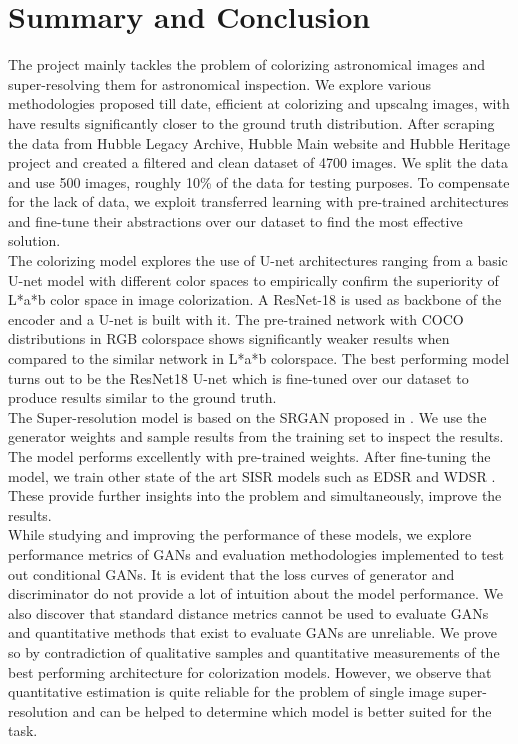 \documentclass[10pt,twocolumn,letterpaper]{article}
\begin{document}
\section{Summary and Conclusion}
    The project mainly tackles the problem of colorizing astronomical images and super-resolving them for astronomical inspection. We explore various methodologies proposed till date, efficient at colorizing and upscalng images, with have results significantly closer to the ground truth distribution. After scraping the data from Hubble Legacy Archive, Hubble Main website and Hubble Heritage project and created a filtered and clean dataset of 4700 images. We split the data and use 500 images, roughly 10\% of the data for testing purposes. To compensate for the lack of data, we exploit transferred learning with pre-trained architectures and fine-tune their abstractions over our dataset to find the most effective solution.\\
    \hspace*{0.167 in}The colorizing model explores the use of U-net architectures ranging from a basic U-net model with different color spaces to empirically confirm the superiority of L*a*b color space in image colorization. A ResNet-18  is used as backbone of the encoder and a U-net is built with it. The pre-trained network with COCO distributions in RGB colorspace shows significantly weaker results when compared to the similar network in L*a*b colorspace. The best performing model turns out to be the ResNet18 U-net which is fine-tuned over our dataset to produce results similar to the ground truth.\\
    \hspace*{0.167 in}The Super-resolution model is based on the SRGAN proposed in \cite{ledig2017photorealistic}. We use the generator weights and sample results from the training set to inspect the results. The model performs excellently with pre-trained weights. After fine-tuning the model, we train other state of the art SISR models such as EDSR \cite{lim2017enhanced} and WDSR \cite{yu2018wide}. These provide further insights into the problem and simultaneously, improve the results.\\
    \hspace*{0.167 in}While studying and improving the performance of these models, we explore performance metrics of GANs and evaluation methodologies implemented to test out conditional GANs. It is evident that the loss curves of generator and discriminator do not provide a lot of intuition about the model performance. We also discover that standard distance metrics cannot be used to evaluate GANs and quantitative methods that exist to evaluate GANs are unreliable. We prove so by contradiction of qualitative samples and quantitative measurements of the best performing architecture for colorization models. However, we observe that quantitative estimation is quite reliable for the problem of single image super-resolution and can be helped to determine which model is better suited for the task.
    
\end{document}
